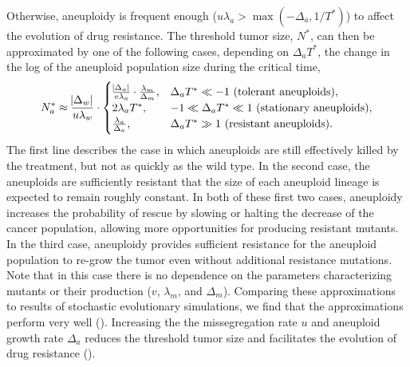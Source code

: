 \documentclass[12pt]{extarticle}
\begin{document}
Otherwise, aneuploidy is frequent enough ($u\lambda_a > \max{(-\Delta_a, 1/T^*)}$) to affect the evolution of drug resistance. 
The threshold tumor size, $N^*$, can then be approximated by one of the following cases, depending on $\Delta_a T^*$, the change in the log of the aneuploid population size during the critical time,
\begin{equation}  \label{eq:N_a}
\begin{aligned}
N_a^* \approx 
  \frac{\abs{\Delta_w}}{u\lambda_w} \cdot \begin{cases}
    \frac{\abs{\Delta_a}}{v\lambda_a} \cdot \frac{\lambda_m}{\Delta_m} ,&
  \Delta_a T^* \ll -1 \text{ (tolerant aneuploids)},\\ 
  2\lambda_a T^* ,&
  -1 \ll \Delta_a T^* \ll 1  \text{ (stationary aneuploids)},\\ 
  \frac{\lambda_a}{\Delta_a} ,&
   \Delta_a T^* \gg 1 \text{ (resistant aneuploids)}.
  \end{cases}
\end{aligned}
\end{equation}
The first line describes the case in which aneuploids are still effectively killed by the treatment, but not as quickly as the wild type. 
In the second case, the aneuploids are sufficiently resistant that the size of each aneuploid lineage is expected to remain roughly constant. 
In both of these first two cases, aneuploidy increases the probability of rescue by slowing or halting the decrease of the cancer population, allowing more opportunities for producing resistant mutants. 
In the third case, aneuploidy provides sufficient resistance for the aneuploid population to re-grow the tumor even without additional resistance mutations.
Note that in this case there is no dependence on the parameters characterizing mutants or their production ($v$, $\lambda_m$, and $\Delta_m$).
Comparing these approximations to results of stochastic evolutionary simulations, we find that the approximations perform very well (). Increasing the the missegregation rate $u$ and aneuploid growth rate $\Delta_a$ reduces the threshold tumor size and facilitates the evolution of drug resistance ().
\end{document}
